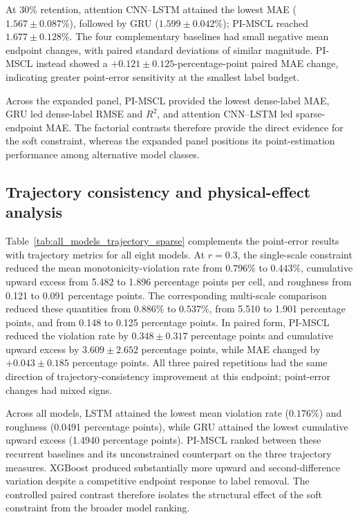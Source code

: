 \documentclass[pdflatex,sn-mathphys-num]{sn-jnl}
\begin{document}
At 30\% retention, attention CNN--LSTM attained the lowest MAE ($1.567\pm0.087\%$), followed by GRU ($1.599\pm0.042\%$); PI-MSCL reached $1.677\pm0.128\%$. The four complementary baselines had small negative mean endpoint changes, with paired standard deviations of similar magnitude. PI-MSCL instead showed a $+0.121\pm0.125$-percentage-point paired MAE change, indicating greater point-error sensitivity at the smallest label budget.



Across the expanded panel, PI-MSCL provided the lowest dense-label MAE, GRU led dense-label RMSE and $R^2$, and attention CNN--LSTM led sparse-endpoint MAE. The factorial contrasts therefore provide the direct evidence for the soft constraint, whereas the expanded panel positions its point-estimation performance among alternative model classes.

\subsection{Trajectory consistency and physical-effect analysis}
\label{subsec:new_trajectory_results}

Table~\ref{tab:all_models_trajectory_sparse} complements the point-error results with trajectory metrics for all eight models. At $r=0.3$, the single-scale constraint reduced the mean monotonicity-violation rate from $0.796\%$ to $0.443\%$, cumulative upward excess from 5.482 to 1.896 percentage points per cell, and roughness from 0.121 to 0.091 percentage points. The corresponding multi-scale comparison reduced these quantities from $0.886\%$ to $0.537\%$, from 5.510 to 1.901 percentage points, and from 0.148 to 0.125 percentage points. In paired form, PI-MSCL reduced the violation rate by $0.348\pm0.317$ percentage points and cumulative upward excess by $3.609\pm2.652$ percentage points, while MAE changed by $+0.043\pm0.185$ percentage points. All three paired repetitions had the same direction of trajectory-consistency improvement at this endpoint; point-error changes had mixed signs.



Across all models, LSTM attained the lowest mean violation rate ($0.176\%$) and roughness (0.0491 percentage points), while GRU attained the lowest cumulative upward excess (1.4940 percentage points). PI-MSCL ranked between these recurrent baselines and its unconstrained counterpart on the three trajectory measures. XGBoost produced substantially more upward and second-difference variation despite a competitive endpoint response to label removal. The controlled paired contrast therefore isolates the structural effect of the soft constraint from the broader model ranking.
\end{document}
